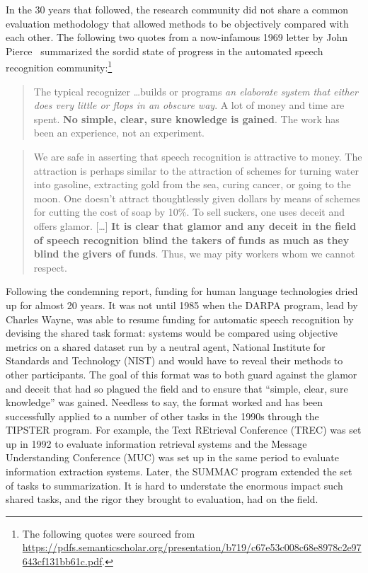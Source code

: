 In the 30 years that followed, the research community did not share a common evaluation methodology that allowed methods to be objectively compared with each other.
The following two quotes from a now-infamous 1969 letter by John Pierce~\citep{pierce1969whither} summarized the sordid state of progress in the automated speech recognition community:\footnote{%
The following quotes were sourced from \href{Mark Liberman's presentation at the CATS reproducibility workshop}{https://pdfs.semanticscholar.org/presentation/b719/c67e53c008c68e8978c2e97643cf131bb61c.pdf}.
}

\begin{quote}
  The typical recognizer \dots builds or programs \textit{an elaborate system that either does very little or flops in an obscure way}. A lot of money and time are spent. \textbf{No simple, clear, sure knowledge is gained}. The work has been an experience, not an experiment.
\end{quote}
\begin{quote}
We are safe in asserting that speech recognition is attractive to money. The attraction is perhaps similar to the attraction of schemes for turning water into gasoline, extracting gold from the sea, curing cancer, or going to the moon. 
One doesn't attract thoughtlessly given dollars by means of schemes for cutting the cost of soap by 10\%.
To sell suckers, one uses deceit and offers glamor. [\dots] \textbf{It is clear that glamor and any deceit in the field of speech recognition blind the takers of funds as much as they blind the givers of funds}. Thus, we may pity workers whom we cannot respect.
\end{quote}

Following the condemning report, funding for human language technologies dried up for almost 20 years.
It was not until 1985 when the DARPA program, lead by Charles Wayne, was able to resume funding for automatic speech recognition by devising the shared task format: systems would be compared using objective metrics on a shared dataset run by a neutral agent, National Institute for Standards and Technology (NIST) and would have to reveal their methods to other participants.
The goal of this format was to both guard against the glamor and deceit that had so plagued the field and to ensure that ``simple, clear, sure knowledge'' was gained.
Needless to say, the format worked and has been successfully applied to a number of other tasks in the 1990s through the TIPSTER program.
For example, the Text REtrieval Conference (TREC) was set up in 1992 to evaluate information retrieval systems and the Message Understanding Conference (MUC) was set up in the same period to evaluate information extraction systems.
Later, the SUMMAC program extended the set of tasks to summarization.
It is hard to understate the enormous impact such shared tasks, and the rigor they brought to evaluation, had on the field.

